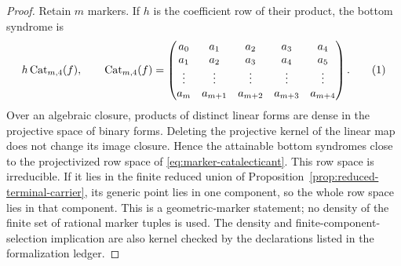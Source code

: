 \begin{proof}
Retain \(m\) markers.  If \(h\) is the coefficient row of their product,
the bottom syndrome is
\[
 h\operatorname{Cat}_{m,4}(f),\qquad
 \operatorname{Cat}_{m,4}(f)=
 \begin{pmatrix}
 a_0&a_1&a_2&a_3&a_4\\
 a_1&a_2&a_3&a_4&a_5\\
 \vdots&\vdots&\vdots&\vdots&\vdots\\
 a_m&a_{m+1}&a_{m+2}&a_{m+3}&a_{m+4}
 \end{pmatrix}.
 \autoeqtag{eq:marker-catalecticant}
\]
Over an algebraic closure, products of distinct linear forms are dense in
the projective space of binary forms.  Deleting the projective kernel of the
linear map does not change its image closure.  Hence the attainable bottom
syndromes close to the projectivized row space of
\eqref{eq:marker-catalecticant}.  This row space is
irreducible.  If it lies in the finite reduced union of
Proposition~\ref{prop:reduced-terminal-carrier}, its generic point lies in
one component, so the whole row space lies in that component.  This is a
geometric-marker statement; no density of the finite set of rational marker
tuples is used.  The density and finite-component-selection implication are
also kernel checked by the declarations listed in the formalization ledger.


\end{proof}
